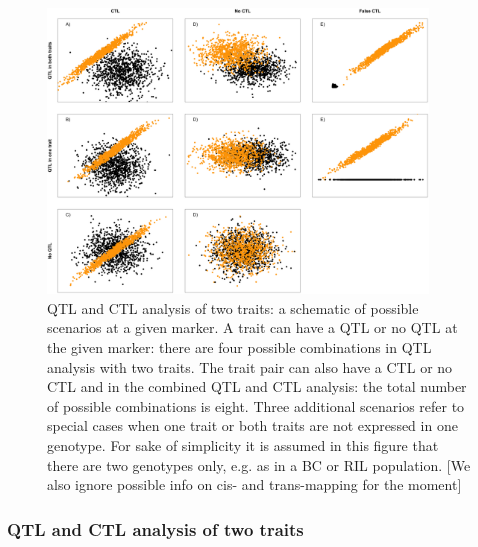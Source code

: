  \begin{figure}[h!]
  \centering
  \includegraphics[width=0.9\textwidth]{eps/image_4_1.eps}
  \caption[CTLs.]{QTL and CTL analysis of two traits: a schematic of possible scenarios at a given marker. A trait can 
          have a QTL or no QTL at the given marker: there are four possible combinations in QTL analysis with two traits. 
          The trait pair can also have a CTL or no CTL and in the combined QTL and CTL analysis: the total number of possible 
          combinations is eight. Three additional scenarios refer to special cases when one trait or both traits are not 
          expressed in one genotype. For sake of simplicity it is assumed in this figure that there are two genotypes only, 
          e.g. as in a BC or RIL population. [We also ignore possible info on cis- and trans-mapping for the moment]}
          \label{fig:ctls}
  \end{figure}

  \subsubsection{QTL and CTL analysis of two traits}
  
